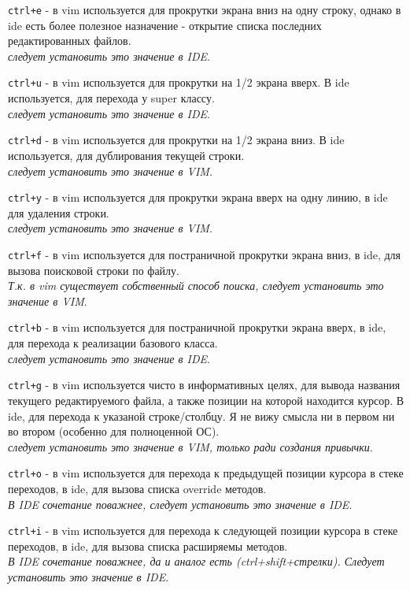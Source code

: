 \documentclass[a4paper, 12pt]{report}
\begin{document}
\begin{list}{*}{}
	\item \lstinline|ctrl+e| - в vim используется для прокрутки экрана вниз на одну строку, однако в ide есть более полезное назначение - открытие списка последних редактированных файлов.\\ \textit{следует установить это значение в IDE}.
	\item \lstinline|ctrl+u| - в vim используется для прокрутки на 1/2 экрана вверх. В ide используется, для перехода у super классу.\\ \textit{следует установить это значение в IDE}.
	\item \lstinline|ctrl+d| - в vim используется для прокрутки на 1/2 экрана вниз. В ide используется, для дублирования текущей строки.\\ \textit{следует установить это значение в VIM}.
	\item \lstinline|ctrl+y| - в vim используется для прокрутки экрана вверх на одну линию, в ide для удаления строки.\\ \textit{следует установить это значение в VIM}.
	\item \lstinline|ctrl+f| - в vim используется для постраничной прокрутки экрана вниз, в ide, для вызова поисковой строки по файлу.\\ \textit{Т.к. в vim существует собственный способ поиска, следует установить это значение в VIM}.
	\item \lstinline|ctrl+b| - в vim используется для постраничной прокрутки экрана вверх, в ide, для перехода к реализации базового класса.\\ \textit{следует установить это значение в IDE}.
	\item \lstinline|ctrl+g| - в vim используется чисто в информативных целях, для вывода названия текущего редактируемого файла, а также позиции на которой находится курсор. В ide, для перехода к указаной строке/столбцу. Я не вижу смысла ни в первом ни во втором (особенно для полноценной ОС).\\ \textit{следует установить это значение в VIM, только ради создания привычки}.
	\item \lstinline|ctrl+o| - в vim используется для перехода к предыдущей позиции курсора в стеке переходов, в ide, для вызова списка override методов.\\ \textit{В IDE сочетание поважнее, следует установить это значение в IDE}.
	\item \lstinline|ctrl+i| - в vim используется для перехода к следующей позиции курсора в стеке переходов, в ide, для вызова списка расширяемы методов.\\ \textit{В IDE сочетание поважнее, да и аналог есть (ctrl+shift+стрелки). Следует установить это значение в IDE}.

\end{list}
\end{document}
